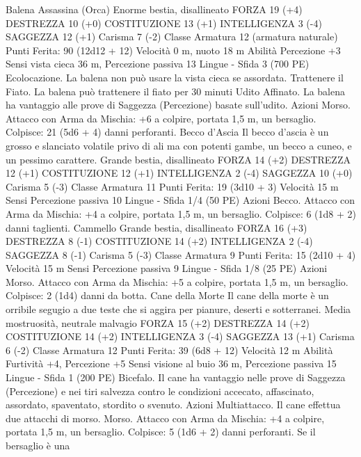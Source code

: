 \begin{multicols}{2}
Balena Assassina
(Orca)
Enorme bestia, disallineato
FORZA 19 (+4)
DESTREZZA 10 (+0)
COSTITUZIONE 13 (+1)
INTELLIGENZA 3 (-4)
SAGGEZZA 12 (+1)
Carisma 7 (-2)
Classe Armatura 12 (armatura naturale)
\hspace*{0pt}\hfill{Punti Ferita}: 90 (12d12 + 12)
Velocità 0 m, nuoto 18 m
Abilità Percezione +3
Sensi vista cieca 36 m, Percezione passiva 13
Lingue -
Sfida 3 (700 PE)
Ecolocazione. La balena non può usare la vista cieca se
assordata.
Trattenere il Fiato. La balena può trattenere il fiato per 30
minuti
Udito Affinato. La balena ha vantaggio alle prove di Saggezza
(Percezione) basate sull’udito.
Azioni
Morso. Attacco con Arma da Mischia: +6 a colpire, portata 1,5
m, un bersaglio.
Colpisce: 21 (5d6 + 4) danni perforanti.
Becco d’Ascia
Il becco d’ascia è un grosso e slanciato volatile privo di
ali ma con potenti gambe, un becco a cuneo, e un
pessimo carattere.
Grande bestia, disallineato
FORZA 14 (+2)
DESTREZZA 12 (+1)
COSTITUZIONE 12 (+1)
INTELLIGENZA 2 (-4)
SAGGEZZA 10 (+0)
Carisma 5 (-3)
Classe Armatura 11
\hspace*{0pt}\hfill{Punti Ferita}: 19 (3d10 + 3)
Velocità 15 m
Sensi Percezione passiva 10
Lingue -
Sfida 1/4 (50 PE)
Azioni
Becco. Attacco con Arma da Mischia: +4 a colpire, portata 1,5
m, un bersaglio.
Colpisce: 6 (1d8 + 2) danni taglienti.
Cammello
Grande bestia, disallineato
FORZA 16 (+3)
DESTREZZA 8 (-1)
COSTITUZIONE 14 (+2)
INTELLIGENZA 2 (-4)
SAGGEZZA 8 (-1)
Carisma 5 (-3)
Classe Armatura 9
\hspace*{0pt}\hfill{Punti Ferita}: 15 (2d10 + 4)
Velocità 15 m
Sensi Percezione passiva 9
Lingue -
Sfida 1/8 (25 PE)
Azioni
Morso. Attacco con Arma da Mischia: +5 a colpire, portata 1,5
m, un bersaglio.
Colpisce: 2 (1d4) danni da botta.
Cane della Morte
Il cane della morte è un orribile segugio a due teste che
si aggira per pianure, deserti e sotterranei.
Media mostruosità, neutrale malvagio
FORZA 15 (+2)
DESTREZZA 14 (+2)
COSTITUZIONE 14 (+2)
INTELLIGENZA 3 (-4)
SAGGEZZA 13 (+1)
Carisma 6 (-2)
Classe Armatura 12
\hspace*{0pt}\hfill{Punti Ferita}: 39 (6d8 + 12)
Velocità 12 m
Abilità Furtività +4, Percezione +5
Sensi visione al buio 36 m, Percezione passiva 15
Lingue -
Sfida 1 (200 PE)
Bicefalo. Il cane ha vantaggio nelle prove di Saggezza
(Percezione) e nei tiri salvezza contro le condizioni accecato,
affascinato, assordato, spaventato, stordito o svenuto.
Azioni
Multiattacco. Il cane effettua due attacchi di morso.
Morso. Attacco con Arma da Mischia: +4 a colpire, portata 1,5
m, un bersaglio.
Colpisce: 5 (1d6 + 2) danni perforanti. Se il bersaglio è una

\end{multicols}
